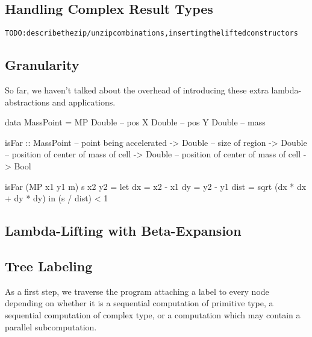 \subsection{Handling Complex Result Types}

\begin{alltt}

TODO: describe the zip/unzip combinations, inserting the lifted constructors

\end{alltt}
\subsection{Granularity}

So far, we haven't talked about the overhead of introducing these extra lambda-abstractions and applications. 
\begin{alltt}

\end{alltt}


\begin{code}
data MassPoint
        = MP    Double          -- pos X
                Double          -- pos Y
                Double          -- mass


isFar   :: MassPoint    -- point being accelerated
        -> Double       -- size of region
        -> Double       -- position of center of mass of cell
        -> Double       -- position of center of mass of cell
        -> Bool

isFar (MP x1 y1 m) s x2 y2 
 = let  dx      = x2 - x1
        dy      = y2 - y1
        dist    = sqrt (dx * dx + dy * dy)
   in   (s / dist) < 1
\end{code}
   









\subsection{Lambda-Lifting with Beta-Expansion}



\subsection{Tree Labeling}

As a first step, we traverse the program attaching a label to every node depending on whether it is a sequential computation of primitive type, a
sequential computation of complex type, or a computation which may contain
a parallel subcomputation. 




